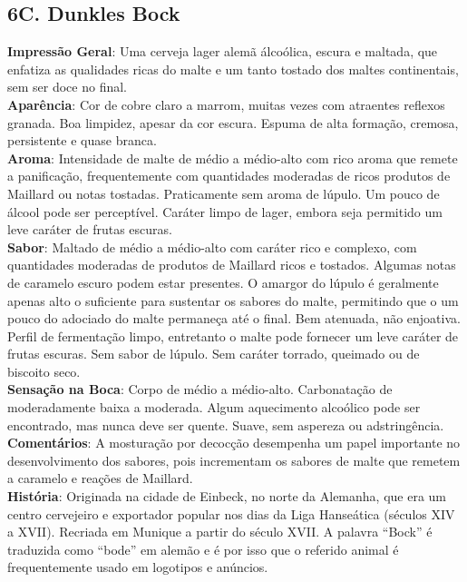 \subsection*{6C. Dunkles Bock}
\textbf{Impressão Geral}: Uma cerveja lager alemã álcoólica, escura e maltada, que enfatiza as qualidades ricas do malte e um tanto tostado dos maltes continentais, sem ser doce no final. \\
\textbf{Aparência}: Cor de cobre claro a marrom, muitas vezes com atraentes reflexos granada. Boa limpidez, apesar da cor escura. Espuma de alta formação, cremosa, persistente e quase branca. \\
\textbf{Aroma}: Intensidade de malte de médio a médio-alto com rico aroma que remete a panificação, frequentemente com quantidades moderadas de ricos produtos de Maillard ou notas tostadas. Praticamente sem aroma de lúpulo. Um pouco de álcool pode ser perceptível. Caráter limpo de lager, embora seja permitido um leve caráter de frutas escuras. \\
\textbf{Sabor}: Maltado de médio a médio-alto com caráter rico e complexo, com quantidades moderadas de produtos de Maillard ricos e tostados. Algumas notas de caramelo escuro podem estar presentes. O amargor do lúpulo é geralmente apenas alto o suficiente para sustentar os sabores do malte, permitindo que o um pouco do adociado do malte permaneça até o final. Bem atenuada, não enjoativa. Perfil de fermentação limpo, entretanto o malte pode fornecer um leve caráter de frutas escuras. Sem sabor de lúpulo. Sem caráter torrado, queimado ou de biscoito seco. \\
\textbf{Sensação na Boca}: Corpo de médio a médio-alto. Carbonatação de moderadamente baixa a moderada. Algum aquecimento alcoólico pode ser encontrado, mas nunca deve ser quente. Suave, sem aspereza ou adstringência. \\
\textbf{Comentários}: A mosturação por decocção desempenha um papel importante no desenvolvimento dos sabores, pois incrementam os sabores de malte que remetem a caramelo e reações de Maillard. \\
\textbf{História}: Originada na cidade de Einbeck, no norte da Alemanha, que era um centro cervejeiro e exportador popular nos dias da Liga Hanseática (séculos XIV a XVII). Recriada em Munique a partir do século XVII. A palavra “Bock” é traduzida como “bode” em alemão e é por isso que o referido animal é frequentemente usado em logotipos e anúncios. \\
